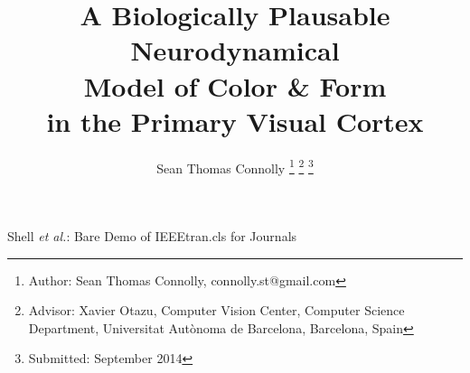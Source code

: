 \documentclass[journal,onecolumn]{IEEEtran}
\begin{document}
\title{A Biologically Plausable Neurodynamical \\ Model of Color \& Form \\ in the Primary Visual Cortex}
%
%
%

\author{Sean Thomas Connolly%
\thanks{Author: Sean Thomas Connolly, connolly.st@gmail.com}%
\thanks{Advisor: Xavier Otazu,  Computer Vision Center, Computer Science Department, Universitat Autònoma de Barcelona, Barcelona, Spain }%
\thanks{Submitted: September 2014}}

% 
%



%
{Shell \MakeLowercase{\textit{et al.}}: Bare Demo of IEEEtran.cls for Journals}



\maketitle
\end{document}
